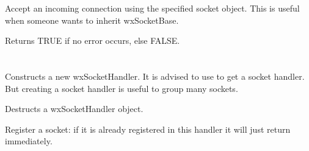 %
%


Accept an incoming connection using the specified socket object.
This is useful when someone wants to inherit wxSocketBase.




Returns TRUE if no error occurs, else FALSE.



\section{}\label{wxsockethandler}





%
%

Constructs a new wxSocketHandler.
It is advised to use 
to get a socket handler. But creating a socket handler is useful to group
many sockets.

%
%


Destructs a wxSocketHandler object.

%
%


Register a socket: if it is already registered in this handler it will just
return immediately.

